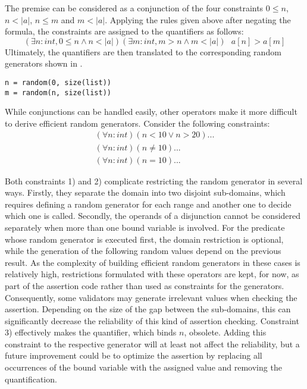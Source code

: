 The premise can be considered as a conjunction of the four constraints $0 \leq n$, $n < |a| $, $n \le m$ and $m < |a|$. Applying the rules given above after negating the formula, the constraints are assigned to the quantifiers as follows:
\begin{equation}\label{eq:sorted_v2_bounds}
	(\exists n : int, 0 \leq n \wedge n < |a|)(\exists m : int, m > n \wedge m < |a|) \text{ } a[n] > a[m]
\end{equation}
Ultimately, the quantifiers are then translated to the corresponding random generators shown in .
\begin{lstlisting}[label=lst:rand]
n = random(0, size(list))
m = random(n, size(list))
\end{lstlisting}

While conjunctions can be handled easily, other operators make it more difficult to derive efficient random generators. Consider the following constraints:
\begin{align}
(\forall n : int) (n < 10 \lor n > 20) ... \\
(\forall n : int) (n \ne 10) ... \\
(\forall n : int) (n = 10) ... 
\end{align}

Both constraints 1) and 2) complicate restricting the random generator in several ways. Firstly, they separate the domain into two disjoint sub-domains, which requires defining a random generator for each range and another one to decide which one is called. Secondly, the operands of a disjunction cannot be considered separately when more than one bound variable is involved. For the predicate whose random generator is executed first, the domain restriction is optional, while the generation of the following random values depend on the previous result. As the complexity of building efficient random generators in these cases is relatively high, restrictions formulated with these operators are kept, for now, as part of the assertion code rather than used as constraints for the generators. Consequently, some validators may generate irrelevant values when checking the assertion. Depending on the size of the gap between the sub-domains, this can significantly decrease the reliability of this kind of assertion checking. Constraint 3) effectively makes the quantifier, which binds $n$, obsolete. Adding this constraint to the respective generator will at least not affect the reliability, but a future improvement could be to optimize the assertion by replacing all occurrences of the bound variable with the assigned value and removing the quantification.\\

